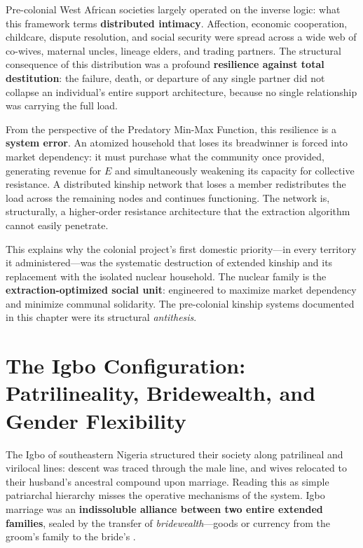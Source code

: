 Pre-colonial West African societies largely operated on the inverse logic: what this framework terms \textbf{distributed intimacy}. Affection, economic cooperation, childcare, dispute resolution, and social security were spread across a wide web of co-wives, maternal uncles, lineage elders, and trading partners. The structural consequence of this distribution was a profound \textbf{resilience against total destitution}: the failure, death, or departure of any single partner did not collapse an individual's entire support architecture, because no single relationship was carrying the full load.

From the perspective of the Predatory Min-Max Function, this resilience is a \textbf{system error}. An atomized household that loses its breadwinner is forced into market dependency: it must purchase what the community once provided, generating revenue for $E$ and simultaneously weakening its capacity for collective resistance. A distributed kinship network that loses a member redistributes the load across the remaining nodes and continues functioning. The network is, structurally, a higher-order resistance architecture that the extraction algorithm cannot easily penetrate.

This explains why the colonial project's first domestic priority---in every territory it administered---was the systematic destruction of extended kinship and its replacement with the isolated nuclear household. The nuclear family is the \textbf{extraction-optimized social unit}: engineered to maximize market dependency and minimize communal solidarity. The pre-colonial kinship systems documented in this chapter were its structural \textit{antithesis}.

\section{The Igbo Configuration: Patrilineality, Bridewealth, and Gender Flexibility}
\label{sec:igbo}

The Igbo of southeastern Nigeria structured their society along patrilineal and virilocal lines: descent was traced through the male line, and wives relocated to their husband's ancestral compound upon marriage. Reading this as simple patriarchal hierarchy misses the operative mechanisms of the system. Igbo marriage was an \textbf{indissoluble alliance between two entire extended families}, sealed by the transfer of \textit{bridewealth}---goods or currency from the groom's family to the bride's \cite{igbo_marriage_scribd}.


